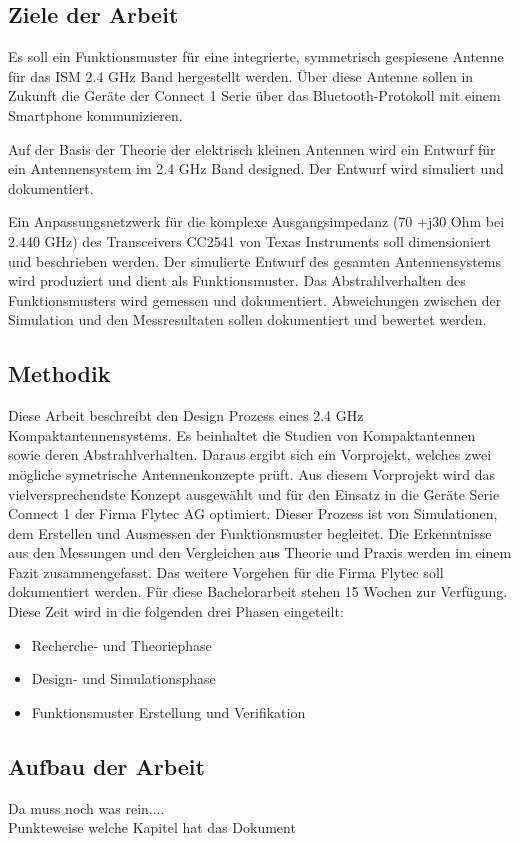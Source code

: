\subsection{Ziele der Arbeit}
Es soll ein Funktionsmuster für eine integrierte, symmetrisch gespiesene Antenne für das ISM 2.4 GHz Band hergestellt werden. Über diese Antenne sollen in Zukunft die Geräte der \glqq Connect 1 \grqq Serie über das Bluetooth-Protokoll mit einem Smartphone kommunizieren. 

Auf der Basis der Theorie der elektrisch kleinen Antennen wird ein Entwurf für ein Antennensystem im 2.4 GHz Band designed. Der Entwurf wird simuliert und dokumentiert. 

Ein Anpassungsnetzwerk  für die komplexe Ausgangsimpedanz (70 +j30 Ohm bei 2.440 GHz) des Transceivers CC2541 von Texas Instruments soll dimensioniert und beschrieben werden.
Der simulierte Entwurf des gesamten Antennensystems wird produziert und dient als Funktionsmuster. Das Abstrahlverhalten des Funktionsmusters wird gemessen und dokumentiert.
Abweichungen zwischen der Simulation und den Messresultaten sollen dokumentiert und bewertet werden.
\subsection{Methodik}
Diese  Arbeit beschreibt den Design Prozess eines 2.4 GHz Kompaktantennensystems. Es beinhaltet die Studien von Kompaktantennen sowie deren Abstrahlverhalten. Daraus ergibt sich ein  Vorprojekt, welches zwei mögliche symetrische Antennenkonzepte prüft. Aus diesem Vorprojekt wird das vielversprechendste Konzept ausgewählt und für den Einsatz in die Geräte Serie \glqq Connect 1 \grqq der Firma Flytec AG optimiert. Dieser Prozess ist von Simulationen, dem  Erstellen und Ausmessen der Funktionsmuster begleitet. Die Erkenntnisse aus den Messungen und den Vergleichen aus Theorie und Praxis werden im einem Fazit zusammengefasst. Das weitere Vorgehen für die Firma Flytec soll dokumentiert werden. Für diese Bachelorarbeit stehen 15 Wochen zur Verfügung. Diese Zeit wird in die folgenden drei Phasen eingeteilt:
\begin{itemize}
	\item Recherche- und Theoriephase
	\item Design- und Simulationsphase 
	\item Funktionsmuster Erstellung und Verifikation
\end{itemize}

\subsection{Aufbau der Arbeit}
Da muss noch was rein....\\
Punkteweise welche Kapitel hat das Dokument




